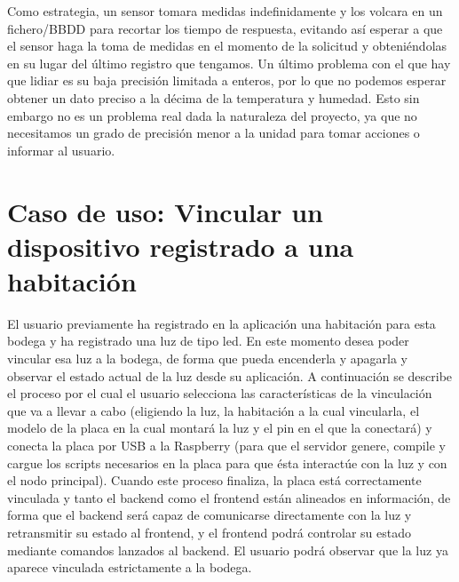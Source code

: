 Como estrategia, un sensor tomara medidas indefinidamente y los volcara en un fichero/BBDD para recortar los tiempo de respuesta, evitando así esperar a que el sensor haga la toma de medidas en el momento de la solicitud y obteniéndolas en su lugar del último registro que tengamos. Un último problema con el que hay que lidiar es su baja precisión limitada a enteros, por lo que no podemos esperar obtener un dato preciso a la décima de la temperatura y humedad. Esto sin embargo no es un problema real dada la naturaleza del proyecto, ya que no necesitamos un grado de precisión menor a la unidad para tomar acciones o informar al usuario.

\section{Caso de uso: Vincular un dispositivo registrado a una habitación}
\label{ch:Capitulo5.2}
El usuario previamente ha registrado en la aplicación una habitación para esta bodega y ha registrado una luz de tipo led. En este momento desea poder vincular esa luz a la bodega, de forma que pueda encenderla y apagarla y observar el estado actual de la luz desde su aplicación. A continuación se describe el proceso por el cual el usuario selecciona las características de la vinculación que va a llevar a cabo (eligiendo la luz, la habitación a la cual vincularla, el modelo de la placa en la cual montará la luz y el pin en el que la conectará) y conecta la placa por USB a la Raspberry (para que el servidor genere, compile y cargue los scripts necesarios en la placa para que ésta interactúe con la luz y con el nodo principal). Cuando este proceso finaliza, la placa está correctamente vinculada y tanto el backend como el frontend están alineados en información, de forma que el backend será capaz de comunicarse directamente con la luz y retransmitir su estado al frontend, y el frontend podrá controlar su estado mediante comandos lanzados al backend. El usuario podrá observar que la luz ya aparece vinculada estrictamente a la bodega.
